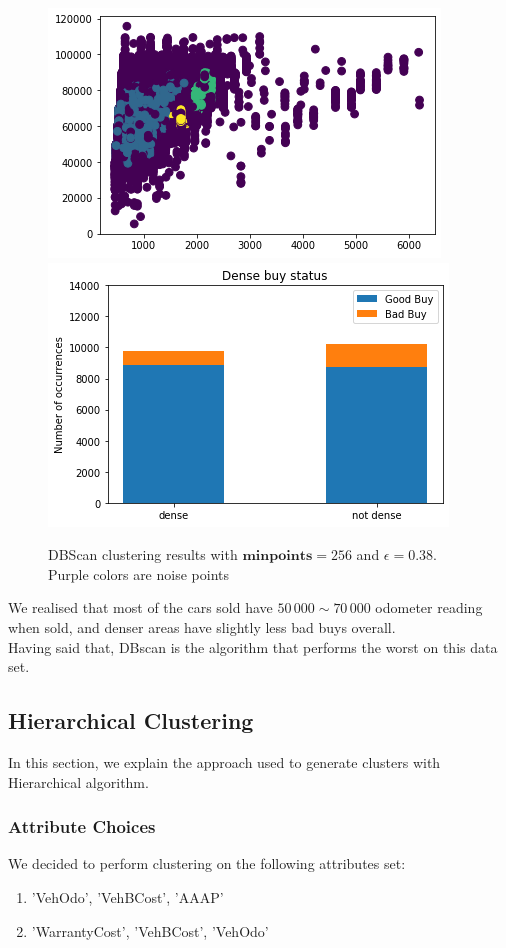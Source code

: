 \documentclass{article}
\begin{document}
	\begin{figure}[H]
		\centering
		\includegraphics[width=.49\textwidth]{cazzo}\hfill
		\includegraphics[width=.49\textwidth]{bigboi}\hfill
		\caption{DBScan clustering results with $\mathbf{minpoints} = 256$ and $\epsilon = 0.38$. Purple colors are noise points}
		\label{fig:dbscan}
	\end{figure}
	
	We realised that most of the cars sold have $50\,000 \sim 70\,000$ odometer reading when sold, and denser areas have slightly less bad buys overall. \\
	Having said that, DBscan is the algorithm that performs the worst on this data set.
	
	\subsection{Hierarchical Clustering}
	In this section, we explain the approach used to generate clusters with Hierarchical algorithm.
	\subsubsection{Attribute Choices}
	We decided to perform clustering on the following attributes set:
	\begin{enumerate}
		\item 'VehOdo', 'VehBCost', 'AAAP'
		\item 'WarrantyCost', 'VehBCost', 'VehOdo'
	\end{enumerate}
	
\end{document}
